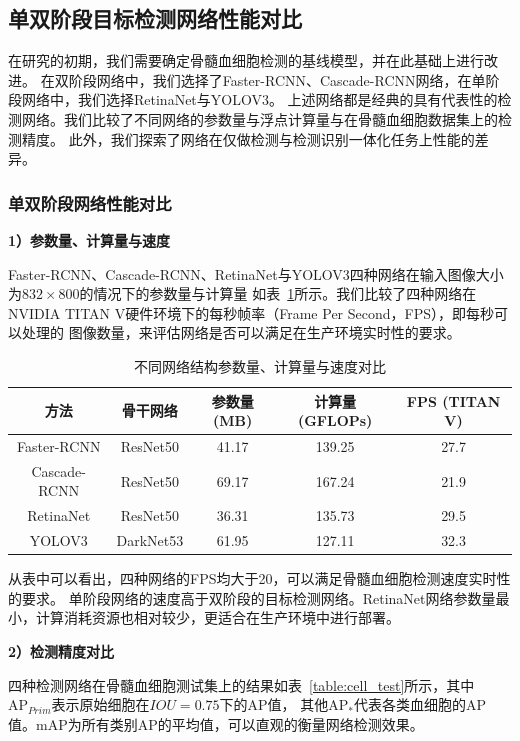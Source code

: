 \subsection{单双阶段目标检测网络性能对比}

在研究的初期，我们需要确定骨髓血细胞检测的基线模型，并在此基础上进行改进。
在双阶段网络中，我们选择了Faster-RCNN、Cascade-RCNN网络，在单阶段网络中，我们选择RetinaNet与YOLOV3。
上述网络都是经典的具有代表性的检测网络。我们比较了不同网络的参数量与浮点计算量与在骨髓血细胞数据集上的检测精度。
此外，我们探索了网络在仅做检测与检测识别一体化任务上性能的差异。

\subsubsection{单双阶段网络性能对比}

\textbf{1）参数量、计算量与速度}

Faster-RCNN、Cascade-RCNN、RetinaNet与YOLOV3四种网络在输入图像大小为$832 \times 800$的情况下的参数量与计算量
如表~\ref{table:cell_Network}所示。我们比较了四种网络在NVIDIA TITAN V硬件环境下的每秒帧率（Frame Per Second，FPS），即每秒可以处理的
图像数量，来评估网络是否可以满足在生产环境实时性的要求。

\begin{table}
  \caption{不同网络结构参数量、计算量与速度对比}   
  \centering 
  \label{table:cell_Network}
  \begin{tabular}{ccccc}
    \toprule[2pt]
    方法 & 骨干网络  & 参数量(MB) & 计算量(GFLOPs) & FPS (TITAN V) \\
    \midrule[1.5pt] 
    Faster-RCNN & ResNet50 &  41.17 & 139.25 & 27.7 \\ 
    Cascade-RCNN & ResNet50 & 69.17 & 167.24 & 21.9   \\ 
    RetinaNet & ResNet50 & 36.31 & 135.73 & 29.5   \\ 
    YOLOV3 & DarkNet53 & 61.95 & 127.11 & 32.3  \\ 
    \bottomrule[2pt]      
  \end{tabular} 
\end{table}

从表中可以看出，四种网络的FPS均大于20，可以满足骨髓血细胞检测速度实时性的要求。
单阶段网络的速度高于双阶段的目标检测网络。RetinaNet网络参数量最小，计算消耗资源也相对较少，更适合在生产环境中进行部署。

\textbf{2）检测精度对比}

四种检测网络在骨髓血细胞测试集上的结果如表~\ref{table:cell_test}所示，其中$\text{AP}_{Prim}$表示原始细胞在$IOU=0.75$下的$\text{AP}$值，
其他$\text{AP}_{*}$代表各类血细胞的$\text{AP}$值。$\text{mAP}$为所有类别$\text{AP}$的平均值，可以直观的衡量网络检测效果。

